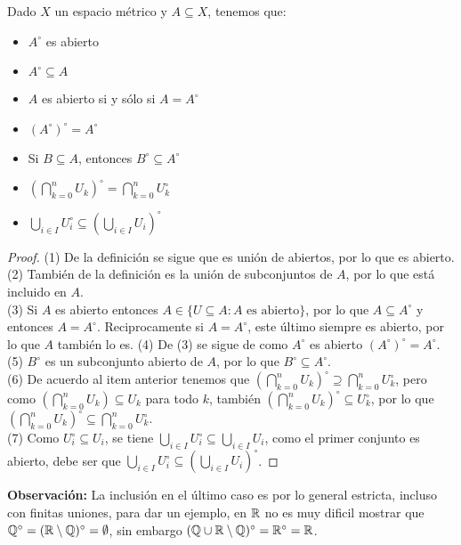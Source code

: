\documentclass[12pt,a4paper]{book}
\begin{document}
\begin{prop}
Dado $X$ un espacio métrico y $A \subseteq X$, tenemos que:
\begin{itemize}
\item[1] $A^\circ$ es abierto
\item[2] $A^\circ \subseteq A$
\item[3] $A$ es abierto si y sólo si $A = A^\circ$
\item[4] $(A^\circ)^\circ = A^\circ$
\item[5] Si $B \subseteq A$, entonces $B^\circ \subseteq A^\circ$
\item[6] $\left(\bigcap_{k = 0}^n U_k\right)^\circ = \bigcap_{k = 0}^n U_k^\circ$
\item[7] $\bigcup_{i \in I} U_i^\circ \subseteq \left(\bigcup_{i \in I} U_i\right)^\circ$
\end{itemize}
\begin{proof}
(1) De la definición se sigue que es unión de abiertos, por lo que es abierto.\\
(2) También de la definición es la unión de subconjuntos de $A$, por lo que está incluido en $A$.\\
(3) Si $A$ es abierto entonces $A \in \{ U \subseteq A : A \mbox{ es abierto}\}$, por lo que $A \subseteq A^\circ$ y entonces $A = A^\circ$. Reciprocamente si $A=A^\circ$, este último siempre es abierto, por lo que $A$ también lo es.
(4) De (3) se sigue de como $A^\circ$ es abierto $(A^\circ)^\circ = A^\circ$.\\
(5) $B^\circ$ es un subconjunto abierto de $A$, por lo que $B^\circ \subseteq A^\circ$.\\
(6) De acuerdo al item anterior tenemos que $\left(\bigcap_{k = 0}^n U_k\right)^\circ \supseteq \bigcap_{k = 0}^n U_k^\circ$, pero como $\left(\bigcap_{k = 0}^n U_k\right) \subseteq U_k$ para todo $k$, también $\left(\bigcap_{k = 0}^n U_k\right)^\circ \subseteq U_k^\circ$, por lo que $\left(\bigcap_{k = 0}^n U_k\right)^\circ \subseteq \bigcap_{k = 0}^n U_k^\circ$.\\
(7) Como $U_i^\circ \subseteq U_i$, se tiene $\bigcup_{i \in I} U_i^\circ \subseteq \bigcup_{i \in I} U_i$, como el primer conjunto es abierto, debe ser que $\bigcup_{i \in I} U_i^\circ \subseteq \left(\bigcup_{i \in I} U_i\right)^\circ$.
\end{proof}
\end{prop}
\textbf{Observación:} La inclusión en el último caso es por lo general estricta, incluso con finitas uniones, para dar un ejemplo, en $\mathbb{R}$ no es muy dificil mostrar que $\mathbb{Q}^\circ = (\mathbb{R} \setminus \mathbb{Q})^\circ = \emptyset$, sin embargo $(\mathbb{Q} \cup \mathbb{R} \setminus \mathbb{Q})^\circ = \mathbb{R}^\circ = \mathbb{R}$.
\end{document}
